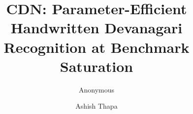 \usepackage[T1]{fontenc}
\usepackage{graphicx}
\usepackage{amsmath,amssymb}
\usepackage{booktabs}
\usepackage{siunitx}
\usepackage{subcaption}
\usepackage{url}
\usepackage[hidelinks]{hyperref}

\ifanon
  \newcommand{\modelname}{CDN}
  \newcommand{\repourl}{\url{https://anonymous.4open.science/r/cdn-dhcd}}
\else
  \newcommand{\modelname}{Barnamala}
  \newcommand{\repourl}{\url{https://github.com/Ampixa/barnamala}}
\fi


\title{\modelname: Parameter-Efficient Handwritten Devanagari Recognition at Benchmark Saturation}
\ifanon
  \author{Anonymous}
\else
  \author{Ashish Thapa}
\fi
\maketitle








\ifanon\else\fi






